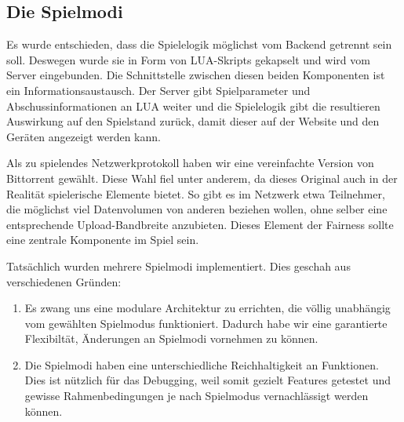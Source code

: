 \subsection{Die Spielmodi}

Es wurde entschieden, dass die Spielelogik möglichst vom Backend getrennt sein soll.
Deswegen wurde sie in Form von LUA-Skripts gekapselt und wird vom Server eingebunden.
Die Schnittstelle zwischen diesen beiden Komponenten ist ein Informationsaustausch.
Der Server gibt Spielparameter und Abschussinformationen an LUA weiter und die Spielelogik gibt die
resultieren Auswirkung auf den Spielstand zurück, damit dieser auf der Website und den Geräten
angezeigt werden kann.

Als zu spielendes Netzwerkprotokoll haben wir eine vereinfachte Version von Bittorrent gewählt.
Diese Wahl fiel unter anderem, da dieses Original auch in der Realität spielerische Elemente bietet.
So gibt es im Netzwerk etwa Teilnehmer, die möglichst viel Datenvolumen von anderen beziehen wollen,
ohne selber eine entsprechende Upload-Bandbreite anzubieten.
Dieses Element der Fairness sollte eine zentrale Komponente im Spiel sein.

Tatsächlich wurden mehrere Spielmodi implementiert.
Dies geschah aus verschiedenen Gründen:
\begin{enumerate}
  \item
    Es zwang uns eine modulare Architektur zu errichten, die völlig unabhängig vom gewählten
    Spielmodus funktioniert.
    Dadurch habe wir eine garantierte Flexibiltät, Änderungen an Spielmodi vornehmen zu können.
  \item
    Die Spielmodi haben eine unterschiedliche Reichhaltigkeit an Funktionen.
    Dies ist nützlich für das Debugging, weil somit gezielt Features getestet und gewisse
    Rahmenbedingungen je nach Spielmodus vernachlässigt werden können.
\end{enumerate}
